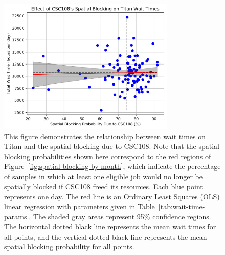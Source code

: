 \begin{figure}
  \includegraphics[width=0.75\textwidth]{images/linfit-wait-time-vs-csc108-spatial.png}
\caption{This figure demonstrates the relationship between wait times on Titan
and the spatial blocking due to CSC108. Note that the spatial blocking
probabilities shown here correspond to the red regions of
Figure~\ref{fig:spatial-blocking-by-month}, which indicate the percentage of
samples in which at least one eligible job would no longer be spatially blocked
if CSC108 freed its resources. Each blue point represents one day. The red line
is an Ordinary Least Squares (OLS) linear regression with parameters given in
Table~\ref{tab:wait-time-params}. The shaded gray areas represent 95\%
confidence regions. The horizontal dotted black line represents the mean wait
times for all points, and the vertical dotted black line represents the mean
spatial blocking probability for all points.}
\label{fig:wait-time-spatial-csc108}
\end{figure}


